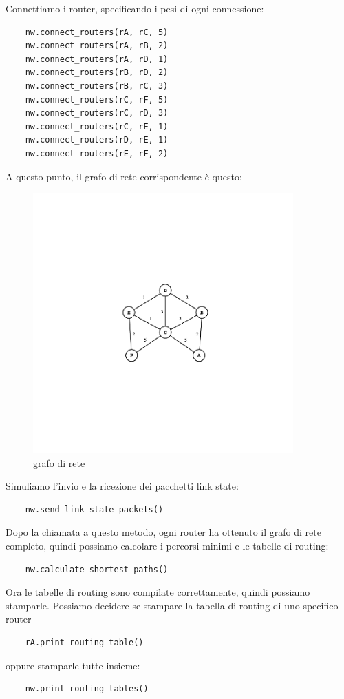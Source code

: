 \documentclass{article}
\begin{document}
Connettiamo i router, specificando i pesi di ogni connessione:
\begin{lstlisting}
    nw.connect_routers(rA, rC, 5)
    nw.connect_routers(rA, rB, 2)
    nw.connect_routers(rA, rD, 1)
    nw.connect_routers(rB, rD, 2)
    nw.connect_routers(rB, rC, 3)
    nw.connect_routers(rC, rF, 5)
    nw.connect_routers(rC, rD, 3)
    nw.connect_routers(rC, rE, 1)
    nw.connect_routers(rD, rE, 1)
    nw.connect_routers(rE, rF, 2)
\end{lstlisting}
\newpage
A questo punto, il grafo di rete corrispondente è questo:
\begin{figure}[htp]
    \centering
    \includegraphics[width=10cm]{graph1.png}
    \caption{grafo di rete}
    \label{fig:grafo di rete}
\end{figure}

Simuliamo l'invio e la ricezione dei pacchetti link state:
\begin{lstlisting}
    nw.send_link_state_packets()
\end{lstlisting}

Dopo la chiamata a questo metodo, ogni router ha ottenuto il grafo di rete completo, quindi possiamo calcolare i percorsi minimi e le tabelle di routing:
\begin{lstlisting}
    nw.calculate_shortest_paths()
\end{lstlisting}

Ora le tabelle di routing sono compilate correttamente, quindi possiamo stamparle. Possiamo decidere se stampare la tabella di routing di uno specifico router
\begin{lstlisting}
    rA.print_routing_table()\end{lstlisting}
oppure stamparle tutte insieme:
\begin{lstlisting}
    nw.print_routing_tables()
\end{lstlisting}
\end{document}
